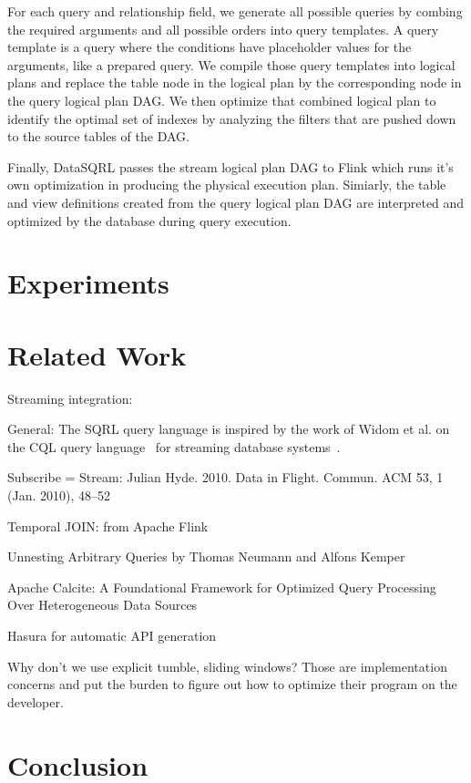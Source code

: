 \documentclass[	DIV=calc,%
							paper=letter,%
							fontsize=11pt,%
							twocolumn]{scrartcl}	 					%
\begin{document}
For each query and relationship field, we generate all possible queries by combing the required arguments and all possible orders into query templates. A query template is a query where the conditions have placeholder values for the arguments, like a prepared query. We compile those query templates into logical plans and replace the table node in the logical plan by the corresponding node in the query logical plan DAG. We then optimize that combined logical plan to identify the optimal set of indexes by analyzing the filters that are pushed down to the source tables of the DAG.

Finally, DataSQRL passes the stream logical plan DAG to Flink which runs it's own optimization in producing the physical execution plan. Simiarly, the table and view definitions created from the query logical plan DAG are interpreted and optimized by the database during query execution.

\section{Experiments}
\label{sec:experiments}


\section{Related Work}
\label{sec:related}

Streaming integration:

General: The SQRL query language is inspired by the work of Widom et al. on the CQL query language~\cite{arasu_cql_2006} for streaming database systems~\cite{arasu_stream_2016}.

Subscribe = Stream: Julian Hyde. 2010. Data in Flight. Commun. ACM 53, 1 (Jan. 2010), 48–52

Temporal JOIN: from Apache Flink

Unnesting Arbitrary Queries by Thomas Neumann and Alfons Kemper

Apache Calcite: A Foundational Framework for Optimized Query Processing Over Heterogeneous Data Sources

Hasura for automatic API generation

Why don't we use explicit tumble, sliding windows? Those are implementation concerns and put the burden to figure out how to optimize their program on the developer.

\section{Conclusion}
\label{sec:conclusion}
\end{document}
